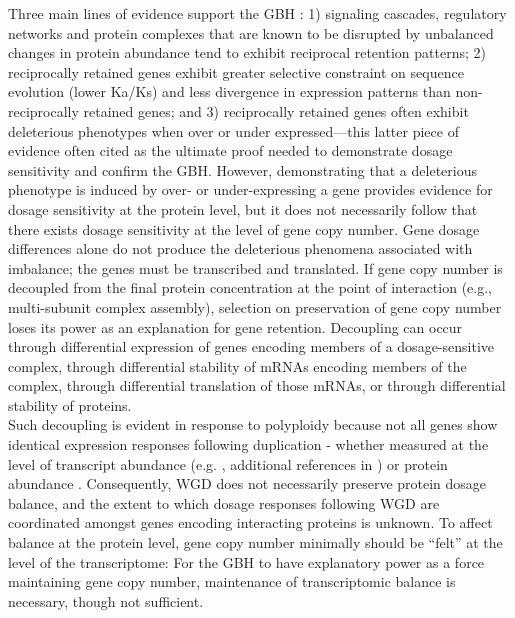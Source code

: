 \documentclass[11pt]{article}
\begin{document}
Three main lines of evidence support the GBH \citep{tasdighian2017, freeling2009, hou2018, edger2009}: 1) signaling cascades, regulatory networks and protein complexes that are known to be disrupted by unbalanced changes in protein abundance tend to exhibit reciprocal retention patterns; 2) reciprocally retained genes exhibit greater selective constraint on sequence evolution (lower Ka/Ks) and less divergence in expression patterns than non-reciprocally retained genes; and 3) reciprocally retained genes often exhibit deleterious phenotypes when over or under expressed---this latter piece of evidence often cited as the ultimate proof needed to demonstrate dosage sensitivity and confirm the GBH.
However, demonstrating that a deleterious phenotype is induced by over- or under-expressing a gene provides evidence for dosage sensitivity at the protein level, but it does not necessarily follow that there exists dosage sensitivity at the level of gene copy number. Gene dosage differences alone do not produce the deleterious phenomena associated with imbalance; the genes must be transcribed and translated. If gene copy number is decoupled from the final protein concentration at the point of interaction (e.g., multi-subunit complex assembly), selection on preservation of gene copy number loses its power as an explanation for gene retention. Decoupling can occur through differential expression of genes encoding members of a dosage-sensitive complex, through differential stability of mRNAs encoding members of the complex, through differential translation of those mRNAs, or through differential stability of proteins.\\

Such decoupling is evident in response to polyploidy because not all genes show identical expression responses following duplication -   whether measured at the level of transcript abundance (e.g. \cite{pirrello2018, hou2018, guo1996, riddle2006, robinson2018, stupar2007, yu2010}, additional references in \cite{doyle2019}) or protein abundance \citep{birchler1981, yao2011, zhu2012, soltis2016, deng2017, fan2017, wang2017, yan2017}. Consequently, WGD does not necessarily preserve protein dosage balance, and the extent to which dosage responses following WGD are coordinated amongst genes encoding interacting proteins is unknown. 
To affect balance at the protein level, gene copy number minimally should be ``felt'' at the level of the transcriptome: For the GBH to have explanatory power as a force maintaining gene copy number, maintenance of transcriptomic balance is necessary, though not sufficient.\\
\end{document}
